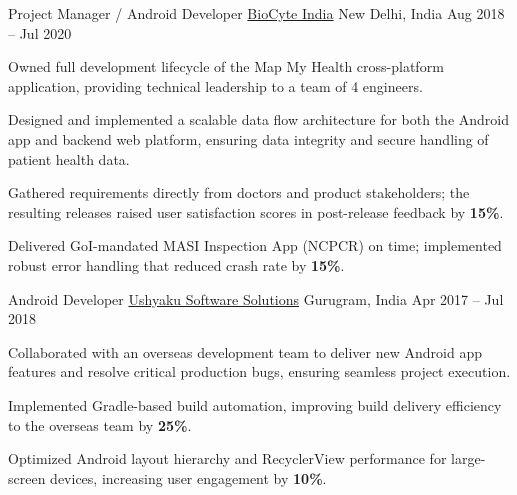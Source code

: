 \begin{cventries}
  \cventry
    {Project Manager / Android Developer} %
    {\href{https://www.biocyteindia.com}{BioCyte India}} %
    {New Delhi, India} %
    {Aug 2018 -- Jul 2020} %
    {
      \begin{cvitems} %
        \item {Owned full development lifecycle of the Map My Health cross-platform application, providing technical leadership to a team of 4 engineers.}
        \item {Designed and implemented a scalable data flow architecture for both the Android app and backend web platform, ensuring data integrity and secure handling of patient health data.}
        \item {Gathered requirements directly from doctors and product stakeholders; the resulting releases raised user satisfaction scores in post-release feedback by \textbf{15\%}.}
        \item {Delivered GoI-mandated MASI Inspection App (NCPCR) on time; implemented robust error handling that reduced crash rate by \textbf{15\%}.}
      \end{cvitems}
    }
\vspace{0.4cm}

  \cventry
    {Android Developer} %
    {\href{https://ushyaku.com}{Ushyaku Software Solutions}} %
    {Gurugram, India} %
    {Apr 2017 -- Jul 2018} %
    {
      \begin{cvitems} %
        \item {Collaborated with an overseas development team to deliver new Android app features and resolve critical production bugs, ensuring seamless project execution.}
        \item {Implemented Gradle-based build automation, improving build delivery efficiency to the overseas team by \textbf{25\%}.}
        \item {Optimized Android layout hierarchy and RecyclerView performance for large-screen devices, increasing user engagement by \textbf{10\%}.}
      \end{cvitems}
    }
\vspace{0.4cm}


\end{cventries}
